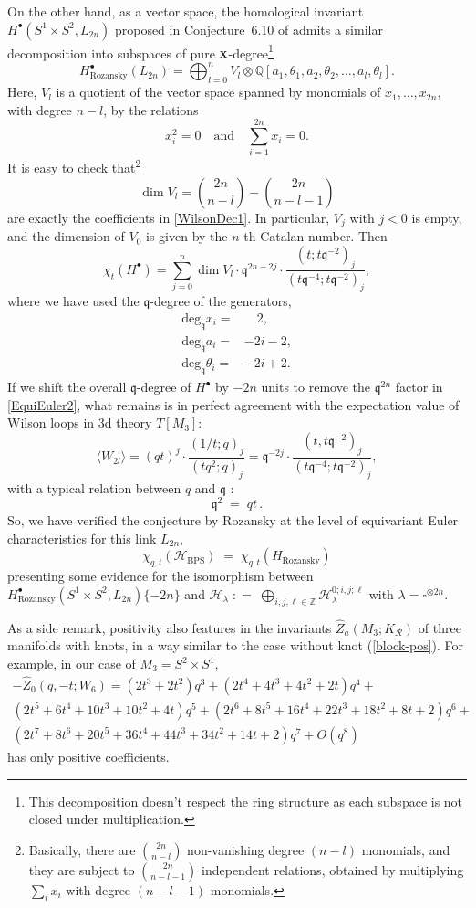 \documentclass[hyper,letterpaper]{JHEP3}
\newcommand{\be}{\begin{equation}}
\newcommand{\ee}{\end{equation}}
\newcommand{\Z}{{\mathbb Z}}
\newcommand{\Q}{{\mathbb Q}}
\def\frak{\mathfrak}
\renewcommand{\hat}{\widehat}
\def\CH{{\mathcal H}}
\def\CR{{\mathcal R}}
\newcommand{\fq}{{\frak q}}
\begin{document}
On the other hand, as a vector space, the homological invariant $H^\bullet(S^1\times S^2,L_{2n})$ proposed in Conjecture~6.10 of \cite{rozansky2010categorification} admits a similar decomposition into subspaces of pure ${\bf x}$-degree\footnote{This decomposition doesn't respect the ring structure as each subspace is not closed under multiplication.}
\be
H^\bullet_{\text{Rozansky}}(L_{2n})=\bigoplus_{l=0}^{n} V_l \otimes \Q[a_1,\theta_1,a_2,\theta_2,\ldots, a_l,\theta_l].
\ee
Here, $V_l$ is a quotient of the vector space spanned by monomials of $x_1,\ldots,x_{2n}$, with degree $n-l$, by the relations
\be
x_i^2=0 \quad \text{and} \quad \sum_{i=1}^{2n} x_i=0.
\ee
It is easy to check that\footnote{Basically, there are ${{2n}\choose {n-l}}$ non-vanishing degree $(n-l)$ monomials, and they are subject to ${{2n}\choose {n-l-1}}$ independent relations, obtained by multiplying $\sum_i x_i$ with degree $(n-l-1)$ monomials.}
\be
\dim V_l= {{2n}\choose {n-l}}-{{2n}\choose {n-l-1}}
\ee
are exactly the coefficients in \eqref{WilsonDec1}. In particular, $V_j$ with $j<0$ is empty, and the dimension of $V_0$ is given by the $n$-th Catalan number.
Then
\be\label{EquiEuler2}
\chi_t(H^\bullet)=\sum_{j=0}^n \dim V_l\cdot\fq^{2n-2j}\cdot\frac{(t;t\fq^{-2})_j}{(t\fq^{-4};t\fq^{-2})_j},
\ee
where we have used the $\fq$-degree of the generators,
\begin{align}
\mathrm{deg}_{\fq} x_i=& \quad 2,\\
\mathrm{deg}_{\fq} a_i=&-2i-2,\\
\mathrm{deg}_{\fq} \theta_i=&-2i+2.
\end{align}
If we shift the overall $\fq$-degree of $H^\bullet$ by $-2n$ units to remove the $\fq^{2n}$ factor in \eqref{EquiEuler2},
what remains is in perfect agreement with the expectation value of Wilson loops in 3d theory $T[M_3]$:
\be
\langle W_{2l}\rangle= (qt)^j\cdot \frac{(1/t;q)_j}{(tq^2;q)_j}=\fq^{-2j}\cdot\frac{(t,t\fq^{-2})_j}{(t\fq^{-4};t\fq^{-2})_j},
\ee
with a typical relation between $q$ and $\fq$ \cite{Fuji:2012pm}:
\be
\fq^2 \; = \; qt \,.
\ee
So, we have verified the conjecture by Rozansky at the level of equivariant Euler characteristics for this link $L_{2n}$,
\be
\chi_{q,t}(\CH_{\text{BPS}}) \; = \; \chi_{q,t}(H_{\text{Rozansky}})
\ee
presenting some evidence for the isomorphism between $H^\bullet_{\text{Rozansky}} (S^1\times S^2,L_{2n}) \{ -2n \}$
and $\CH_{\lambda} \; : = \; \bigoplus_{i,j,\ell\in\Z}\CH_{\lambda}^{0;i,j;\ell}$ with $\lambda = {\square}^{\otimes 2n}$.

As a side remark, positivity also features in the invariants $\hat{Z}_a(M_3; K_{\CR})$
of three manifolds with knots, in a way similar to the case without knot (\ref{block-pos}).
For example, in our case of $M_3 = S^2 \times S^1$,
\begin{multline}
	-\hat{Z}_0(q,-t;W_{6})=
	\left(2 t^3+2 t^2\right) q^3+\left(2 t^4+4 t^3+4 t^2+2 t\right) q^4+\\
	\left(2 t^5+6 t^4+10 t^3+10 t^2+4 t\right) q^5+
	\left(2 t^6+8 t^5+16
	   t^4+22 t^3+18 t^2+8 t+2\right) q^6+
	   \\
	   \left(2 t^7+8 t^6+20 t^5+36 t^4+44 t^3+34 t^2+14 t+2\right) q^7+O\left(q^8\right)
\end{multline}
has only positive coefficients.
\end{document}
